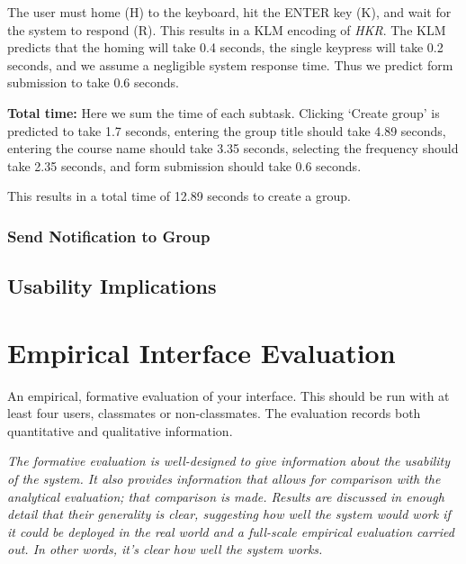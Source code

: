 \documentclass[conference]{IEEEtran}
\begin{document}
The user must home (H) to the keyboard, hit the ENTER key (K), and wait for the system to respond (R).
This results in a KLM encoding of \emph{HKR}.
The KLM predicts that the homing will take 0.4 seconds, the single keypress will take 0.2 seconds, and we assume a negligible system response time.
Thus we predict form submission to take 0.6 seconds.

\textbf{Total time:}
Here we sum the time of each subtask.
Clicking `Create group' is predicted to take 1.7 seconds,
entering the group title should take 4.89 seconds,
entering the course name should take 3.35 seconds,
selecting the frequency should take 2.35 seconds,
and form submission should take 0.6 seconds.

This results in a total time of 12.89 seconds to create a group.


\subsubsection{Send Notification to Group}


\subsection{Usability Implications}


\section{Empirical Interface Evaluation}
An empirical, formative evaluation of your interface. This should be run with at least four users, classmates or non-classmates. The evaluation records both quantitative and qualitative information. 

\emph{The formative evaluation is well-designed to give information about the usability of the system. It also provides information that allows for comparison with the analytical evaluation; that comparison is made. Results are discussed in enough detail that their generality is clear, suggesting how well the system would work if it could be deployed in the real world and a full-scale empirical evaluation carried out. In other words, it's clear how well the system works.}

\end{document}

